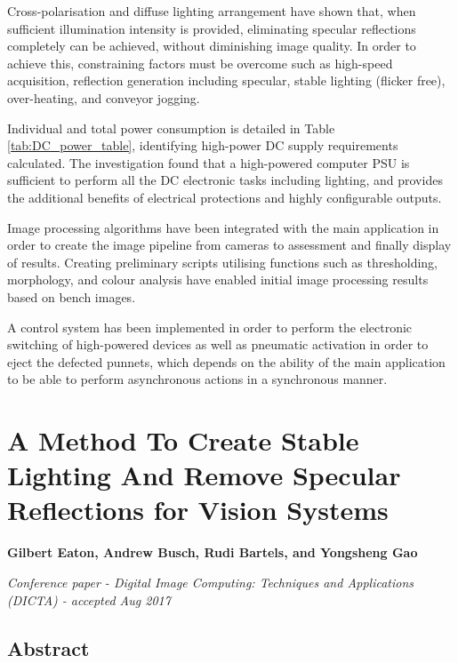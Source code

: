 \documentclass[fleqn,twoside,12pt]{report}
\begin{document}
Cross-polarisation and diffuse lighting arrangement have shown that, when sufficient illumination intensity is provided, eliminating specular reflections completely can be achieved, without diminishing image quality. In order to achieve this, constraining factors must be overcome such as high-speed acquisition, reflection generation including specular, stable lighting (flicker free), over-heating, and conveyor jogging. 

Individual and total power consumption is detailed in Table \ref{tab:DC_power_table}, identifying high-power DC supply requirements calculated. The investigation found that a high-powered computer PSU is sufficient to perform all the DC electronic tasks including lighting, and provides the additional benefits of electrical protections and highly configurable outputs.

Image processing algorithms have been integrated with the main application in order to create the image pipeline from cameras to assessment and finally display of results. Creating preliminary scripts utilising functions such as thresholding, morphology, and colour analysis have enabled initial image processing results based on bench images.


A control system has been implemented in order to perform the electronic switching of high-powered devices as well as pneumatic activation in order to eject the defected punnets, which depends on the ability of the main application to be able to perform asynchronous actions in a synchronous manner.




\newpage
\chapter{A Method To Create Stable Lighting And Remove Specular Reflections for Vision Systems}
\label{sec:paper_1}

\textbf{Gilbert Eaton, Andrew Busch, Rudi Bartels, and Yongsheng Gao}

\textit{Conference paper - Digital Image Computing: Techniques and Applications (DICTA) - accepted Aug 2017}


\section{Abstract}
\end{document}
